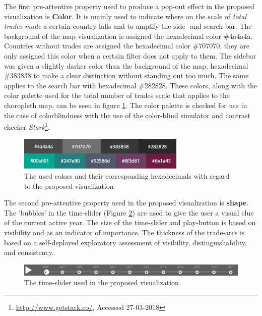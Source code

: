 The first pre-attentive property used to produce a pop-out effect in the proposed visualization is \textbf{Color}. It is mainly used to indicate where on the scale of \textit{total trades made} a certain country falls and to amplify the side- and search bar. The background of the map visualization is assigned the hexadecimal color \#4a4a4a. Countries without trades are assigned the hexadecimal color \#707070, they are only assigned this color when a certain filter does not apply to them. The sidebar was given a slightly darker color than the background of the map, hexadecimal \#383838 to make a clear distinction without standing out too much. The same applies to the search bar with hexadecimal \#282828. These colors, along with the color palette used for the total number of trades scale that applies to the choropleth map, can be seen in figure \ref{colorimg}. The color palette is checked for use in the case of colorblindness with the use of the color-blind simulator and contrast checker \textit{Stark}\footnote{\url{http://www.getstark.co/}, Accessed 27-03-2018}. 

\begin{figure} [h]
\centering
\includegraphics[width= 8cm]{images/colors.png}
\caption{The used colors and their corresponding hexadecimals with regard to the proposed visualization}
\label{colorimg}
\end{figure}

The second pre-attentive property used in the proposed visualization is \textbf{shape}. The 'bubbles' in the time-slider (Figure \ref{slideimg}) are used to give the user a visual clue of the current active year. The size of the time-slider and play-button is based on visibility and as an indicator of importance. The thickness of the trade-arcs is based on a self-deployed exploratory assessment of visibility, distinguishability, and consistency. 

\begin{figure} [h]
\centering
\includegraphics[width= \linewidth]{images/slider.PNG}
\caption{The time-slider used in the proposed visualization}
\label{slideimg}
\end{figure}

